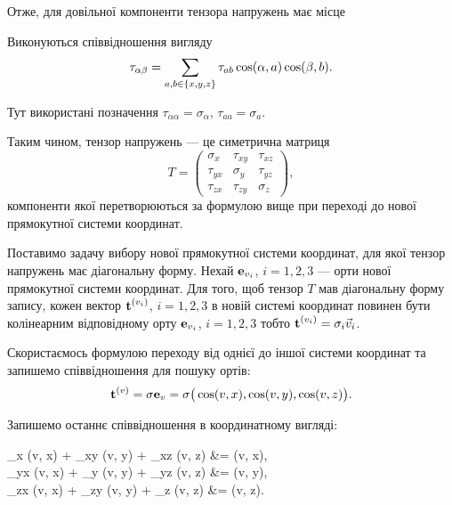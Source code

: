 Отже, для довільної компоненти тензора напружень має місце 
\begin{theorem}
	Виконуються співвідношення вигляду
	\begin{equation}
		\tau_{\alpha \beta} = \Sum_{a, b \in \{x, y, z\}} \tau_{a b} \cos (\alpha, a) \cos (\beta, b).
	\end{equation}
\end{theorem}

\begin{remark}
	Тут використані позначення $\tau_{\alpha \alpha} = \sigma_\alpha$, $\tau_{a a} = \sigma_a$.
\end{remark}

Таким чином, тензор напружень --- це симетрична матриця
\begin{equation}
	T = 
	\begin{pmatrix}
		\sigma_x & \tau_{xy} & \tau_{xz} \\
		\tau_{yx} & \sigma_y & \tau_{yz} \\
		\tau_{zx} & \tau_{zy} & \sigma_z
	\end{pmatrix},
\end{equation}
компоненти якої перетворюються за формулою вище при переході до нової прямокутної системи координат. \medskip

Поставимо задачу вибору нової прямокутної системи координат, для якої тензор напружень має діагональну форму. Нехай $\bf{e}_{v_i}$, $i = 1, 2, 3$ --- орти нової прямокутної системи координат. Для того, щоб тензор $T$ мав діагональну форму запису, кожен вектор $\bf{t}^{(v_i)}$, $i = 1, 2, 3$ в новій системі координат повинен бути колінеарним відповідному орту $\bf{e}_{v_i}$, $i = 1, 2, 3$ тобто $\bf{t}^{(v_i)} = \sigma_i \vec v_i$. \medskip

Скористаємось формулою переходу від однієї до іншої системи координат та запишемо співвідношення для пошуку ортів:
\begin{equation}
	\bf{t}^{(v)} = \sigma \bf{e}_v = \sigma \big( \cos(v, x), \cos (v, y), \cos (v, z) \big).
\end{equation}

Запишемо останнє співвідношення в координатному вигляді:
\begin{system}
	\sigma_x \cos(v, x) + \tau_{xy} \cos(v, y) + \tau_{xz} \cos(v, z) &= \sigma \cos(v, x), \\
	\tau_{yx} \cos(v, x) + \sigma_y \cos(v, y) + \tau_{yz} \cos(v, z) &= \sigma \cos(v, y), \\
	\tau_{zx} \cos(v, x) + \tau_{zy} \cos(v, y) + \sigma_z \cos(v, z) &= \sigma \cos(v, z).
\end{system}

